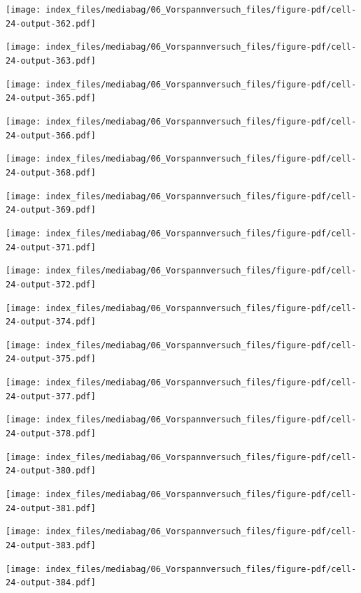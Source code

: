 \documentclass[
  11pt,
  letterpaper,
]{scrreprt}
\begin{document}
\newpage{}

\texttt{[image: index\_files/mediabag/06\_Vorspannversuch\_files/figure-pdf/cell-24-output-362.pdf]}

\texttt{[image: index\_files/mediabag/06\_Vorspannversuch\_files/figure-pdf/cell-24-output-363.pdf]}

\newpage{}

\texttt{[image: index\_files/mediabag/06\_Vorspannversuch\_files/figure-pdf/cell-24-output-365.pdf]}

\texttt{[image: index\_files/mediabag/06\_Vorspannversuch\_files/figure-pdf/cell-24-output-366.pdf]}

\newpage{}

\texttt{[image: index\_files/mediabag/06\_Vorspannversuch\_files/figure-pdf/cell-24-output-368.pdf]}

\texttt{[image: index\_files/mediabag/06\_Vorspannversuch\_files/figure-pdf/cell-24-output-369.pdf]}

\newpage{}

\texttt{[image: index\_files/mediabag/06\_Vorspannversuch\_files/figure-pdf/cell-24-output-371.pdf]}

\texttt{[image: index\_files/mediabag/06\_Vorspannversuch\_files/figure-pdf/cell-24-output-372.pdf]}

\newpage{}

\texttt{[image: index\_files/mediabag/06\_Vorspannversuch\_files/figure-pdf/cell-24-output-374.pdf]}

\texttt{[image: index\_files/mediabag/06\_Vorspannversuch\_files/figure-pdf/cell-24-output-375.pdf]}

\newpage{}

\texttt{[image: index\_files/mediabag/06\_Vorspannversuch\_files/figure-pdf/cell-24-output-377.pdf]}

\texttt{[image: index\_files/mediabag/06\_Vorspannversuch\_files/figure-pdf/cell-24-output-378.pdf]}

\newpage{}

\texttt{[image: index\_files/mediabag/06\_Vorspannversuch\_files/figure-pdf/cell-24-output-380.pdf]}

\texttt{[image: index\_files/mediabag/06\_Vorspannversuch\_files/figure-pdf/cell-24-output-381.pdf]}

\newpage{}

\texttt{[image: index\_files/mediabag/06\_Vorspannversuch\_files/figure-pdf/cell-24-output-383.pdf]}

\texttt{[image: index\_files/mediabag/06\_Vorspannversuch\_files/figure-pdf/cell-24-output-384.pdf]}
\end{document}
